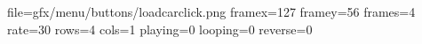 file=gfx/menu/buttons/loadcarclick.png
framex=127
framey=56
frames=4
rate=30
rows=4
cols=1
playing=0
looping=0
reverse=0